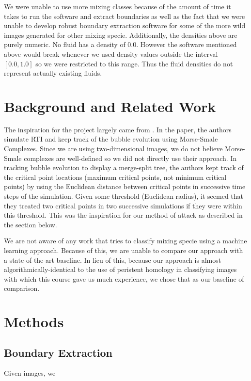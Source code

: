 \documentclass[12pt, fullpage,letterpaper]{article}
\theoremstyle{definition}
\begin{document}
	We were unable to use more mixing classes because of the amount of time it takes to run the software and extract boundaries as well as the fact that we were unable to develop robust boundary extraction software for some of the more wild images generated for other mixing specie. Additionally, the densities above are purely numeric. No fluid has a density of 0.0. However the software mentioned above would break whenever we used density values outside the interval $[0.0, 1.0]$ so we were restricted to this range. Thus the fluid densities do not represent actually existing fluids. 
	
	\section*{\normalfont Background and Related Work}
	The inspiration for the project largely came from \cite{paper}. In the paper, the authors simulate RTI and keep track of the bubble evolution using Morse-Smale Complexes. Since we are using two-dimensional images, we do not believe Morse-Smale complexes are well-defined so we did not directly use their approach. In tracking bubble evolution to display a merge-split tree, the authors kept track of the critical point locations (maximum critical points, not minimum critical points) by using the Euclidean distance between critical points in successive time steps of the simulation. Given some threshold (Euclidean radius), it seemed that they treated two critical points in two successive simulations if they were within this threshold. This was the inspiration for our method of attack as described in the section below. 
	
	We are not aware of any work that tries to classify mixing specie using a machine learning approach. Because of this, we are unable to compare our approach with a state-of-the-art baseline. In lieu of this, because our approach is almost algorithmically-identical to the use of peristent homology in classifying images with which this course gave us much experience, we chose that as our baseline of comparison.  
	
	\section*{\normalfont Methods}
	\subsection*{\normalfont Boundary Extraction} Given images, we
\end{document}
